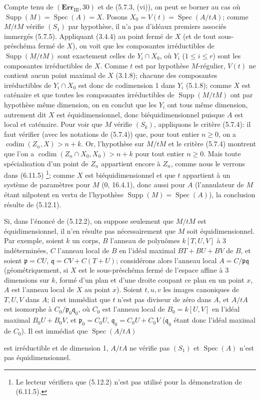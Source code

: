 Compte tenu de $(\mathbf{Err}_{\mathrm{III}},30)$ et de (5.7.3, (vi)), on peut
se borner au cas où $\operatorname{Supp}(M)=\operatorname{Spec}(A)=X$. Posons
$X_0=V(t)=\operatorname{Spec}(A/tA)$; comme $M/tM$ vérifie $(S_1)$ par
hypothèse, il n'a pas d'idéaux premiers associés immergés (5.7.5). Appliquant
(3.4.4) au point fermé de $X$ (et de tout sous-préschéma fermé de $X$), on
voit que les composantes irréductibles de $\operatorname{Supp}(M/tM)$ sont
exactement celles de $Y_i\cap X_0$, où $Y_i$ ($1\leq i\leq r$) sont les
composantes irréductibles de $X$. Comme $t$ est par hypothèse $M$-régulier,
$V(t)$ ne contient aucun point maximal de $X$ (3.1.8); chacune des composantes
irréductibles de $Y_i\cap X_0$ est donc de codimension 1 dans $Y_i$ (5.1.8);
comme $X$ est caténaire et que toutes les composantes irréductibles de
$\operatorname{Supp}(M/tM)$ ont par hypothèse même dimension, on en conclut
que les $Y_i$ ont tous même dimension, autrement dit $X$ est équidimensionnel,
donc biéquidimensionnel puisque $A$ est local et caténaire. Pour voir que $M$
vérifie $(S_k)$, appliquons le critère (5.7.4): il faut vérifier (avec les
notations de (5.7.4)) que, pour tout entier $n\geq0$, on a
$\operatorname{codim}(Z_n,X)>n+k$. Or, l'hypothèse sur $M/tM$ et le critère
(5.7.4) montrent que l'on a
$\operatorname{codim}(Z_n\cap X_0,X_0)>n+k$ pour tout entier $n\geq0$. Mais
toute spécialisation d'un point de $Z_n$ appartient encore à $Z_n$, comme nous
le verrons dans (6.11.5)
\footnote{Le lecteur vérifiera que (5.12.2) n'est pas utilisé pour la
démonstration de (6.11.5).}; comme $X$ est biéquidimensionnel et que $t$
appartient à un système de paramètres pour $M$ (0, 16.4.1), donc aussi pour
$A$ (l'annulateur de $M$ étant nilpotent en vertu de l'hypothèse
$\operatorname{Supp}(M)=\operatorname{Spec}(A)$), la conclusion résulte de
(5.12.1).

\begin{remark}[5.12.3]
\label{IV.2.s5.12.3-fr}
Si, dans l'énoncé de (5.12.2), on suppose seulement que $M/tM$ est
équidimensionnel, il n'en résulte pas nécessairement que $M$ soit
équidimensionnel. Par exemple, soient $k$ un corps, $B$ l'anneau de polynômes
$k[T,U,V]$ à 3 indéterminées, $C$ l'anneau local de $B$ en l'idéal maximal
$BT+BU+BV$ de $B$, et soient $\mathfrak p=CU$,
$\mathfrak q=CV+C(T+U)$; considérons alors l'anneau local
$A=C/\mathfrak p\mathfrak q$ (géométriquement, si $X$ est le sous-préschéma
fermé de l'espace affine à 3 dimensions sur $k$, formé d'un plan et d'une
droite coupant ce plan en un point $x$, $A$ est l'anneau local de $X$ au point
$x$). Soient $t,u,v$ les images canoniques de $T,U,V$ dans $A$; il est
immédiat que $t$ n'est pas diviseur de zéro dans $A$, et $A/tA$ est isomorphe
à $C_0/\mathfrak p_0\mathfrak q_0$, où $C_0$ est l'anneau local de
$B_0=k[U,V]$ en l'idéal maximal $B_0U+B_0V$, et
$\mathfrak p_0=C_0U$, $\mathfrak q_0=C_0U+C_0V$ ($\mathfrak q_0$ étant donc
l'idéal maximal de $C_0$). Il est immédiat que $\operatorname{Spec}(A/tA)$


est irréductible et de dimension 1, $A/tA$ ne vérifie pas $(S_1)$ et
$\operatorname{Spec}(A)$ n'est pas équidimensionnel.
\end{remark}

